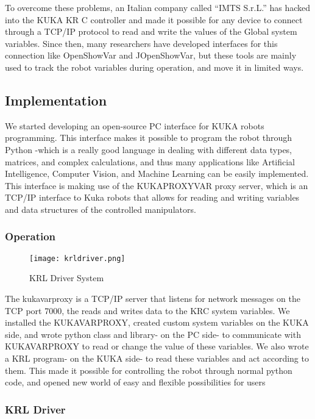 To overcome these problems, an Italian company called “IMTS S.r.L.” has hacked into the KUKA KR C controller and made it possible for any device to connect through a TCP/IP protocol to read and write the values of the Global system variables. Since then, many researchers have developed interfaces for this connection like OpenShowVar and JOpenShowVar, but these tools are mainly used to track the robot variables during operation, and move it in limited ways.
\subsection{Implementation}

We started developing an open-source PC interface for KUKA robots programming. This interface makes it possible to program the robot through Python -which is a really good language in dealing with different data types, matrices, and complex calculations, and thus many applications like Artificial Intelligence, Computer Vision, and Machine Learning can be easily implemented. 
This interface is making use of the KUKAPROXYVAR proxy server, which is an TCP/IP interface to Kuka robots that allows for reading and writing variables and data structures of the controlled manipulators.
 
\subsubsection{Operation}
\begin{figure}[H]
	\centering
	\caption{KRL Driver System}
	\texttt{[image: krldriver.png]}
	\end{figure}
	The kukavarproxy is a TCP/IP server that listens for network messages on the TCP port 7000, the reads and writes data to the KRC system variables.
	We installed the KUKAVARPROXY, created custom system variables on the KUKA side, and wrote python class and library- on the PC side- to communicate with KUKAVARPROXY to read or change the value of these variables. We also wrote a KRL program- on the KUKA side- to read these variables and act according to them. This made it possible for controlling the robot through normal python code, and opened new world of easy and flexible possibilities for users

\subsubsection{KRL Driver}
